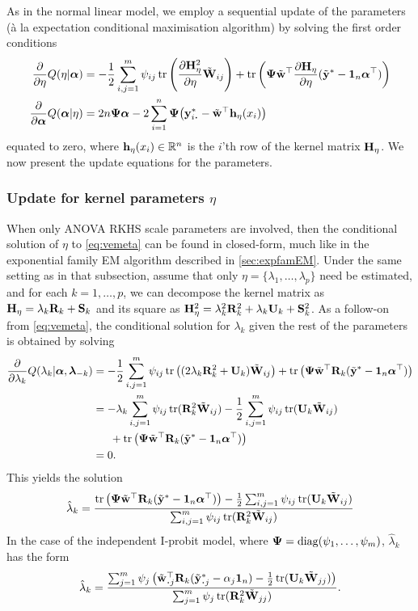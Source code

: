 As in the normal linear model, we employ a sequential update of the parameters (à la expectation conditional maximisation algorithm) by solving the first order conditions
\begin{align}
  \frac{\partial}{\partial\eta}Q(\eta|\balpha)
  &= -\half \sum_{i,j=1}^m \psi_{ij} \tr \left( \frac{\partial \bH_\eta^2}{\partial\eta} \tilde\bW_{ij} \right) 
  + \tr\left( \bPsi \tilde\bw^\top  \frac{\partial \bH_\eta}{\partial\eta} (\tilde\by^* - \bone_n\balpha^\top)  \right) \label{eq:vemeta} \\
  \frac{\partial}{\partial\balpha}Q(\balpha|\eta)
  &= 2n\bPsi\balpha - 2 \sum_{i=1}^n \bPsi \big(\by_{i\bigcdot}^* - \tilde\bw^\top\bh_\eta(x_i) \big) \label{eq:vemalpha}
\end{align}
equated to zero, where ${\mathbf h}_\eta(x_i) \in \mathbb{R}^n$ is the $i$'th row of the kernel matrix ${\mathbf H}_\eta$.
We now present the update equations for the parameters.

\subsubsection{Update for kernel parameters $\eta$}

When only ANOVA RKHS scale parameters are involved, then the conditional solution of $\eta$ to \cref{eq:vemeta} can be found in closed-form, much like in the exponential family EM algorithm described in \cref{sec:expfamEM}.
Under the same setting as in that subsection, assume that only $\eta = \{\lambda_1,\dots,\lambda_p\}$ need be estimated, and for each $k=1,\dots,p$, we can decompose the kernel matrix as ${\mathbf H}_\eta = \lambda_k {\mathbf R}_k + {\mathbf S}_k$ and its square as ${\mathbf H}_\eta^2 = \lambda_k^2 {\mathbf R}_k^2 + \lambda_k {\mathbf U}_k + {\mathbf S}_k^2$.
As a follow-on from \cref{eq:vemeta}, the conditional solution for $\lambda_k$ given the rest of the parameters is obtained by solving
\begin{align*}
  \frac{\partial}{\partial\lambda_k}Q(\lambda_k|{\bm\alpha},{\bm\lambda}_{-k})
  &= -\frac{1}{2} \sum_{i,j=1}^m \psi_{ij} \operatorname{tr} \left( (2\lambda_k{\mathbf R}_k^2 + {\mathbf U}_k) \tilde{{\mathbf W}}_{ij} \right) 
  + \operatorname{tr}\left( {\bm\Psi} \tilde{{\mathbf w}}^\top {\mathbf R}_k (\tilde{{\mathbf y}}^* - {\mathbf 1}_n{\bm\alpha}^\top)  \right) \\
  &= - \lambda_k \sum_{i,j=1}^m \psi_{ij} \operatorname{tr}({\mathbf R}_k^2\tilde{{\mathbf W}}_{ij})
  - \frac{1}{2} \sum_{i,j=1}^m \psi_{ij} \operatorname{tr}({\mathbf U}_k\tilde{{\mathbf W}}_{ij}) \\
  &\phantom{==} + \operatorname{tr}\left( {\bm\Psi} \tilde{{\mathbf w}}^\top {\mathbf R}_k (\tilde{{\mathbf y}}^* - {\mathbf 1}_n{\bm\alpha}^\top)  \right) \\
  &=0.
\end{align*}
This yields the solution
\[
  \hat\lambda_k 
  = \frac{
  \operatorname{tr}\left( {\bm\Psi} \tilde{{\mathbf w}}^\top {\mathbf R}_k (\tilde{{\mathbf y}}^* - {\mathbf 1}_n{\bm\alpha}^\top) \right)
  - \frac{1}{2} \sum_{i,j=1}^m \psi_{ij} \operatorname{tr}({\mathbf U}_k\tilde{{\mathbf W}}_{ij})
  }{
  \sum_{i,j=1}^m \psi_{ij} \operatorname{tr}({\mathbf R}_k^2\tilde{{\mathbf W}}_{ij})
  }
\]
In the case of the independent I-probit model, where ${\bm\Psi} = \operatorname{diag}(\psi_1,\dots,\psi_m)$, $\hat\lambda_k$ has the form
\[
  \hat\lambda_k
  = \frac{
  \sum_{j=1}^m \psi_j \left( \tilde\bw^\top_{\bigcdot j} \bR_k (\tilde\by^*_{\bigcdot j} - \alpha_j\bone_n) - \half \tr(\bU_k\tilde\bW_{jj})\right)
  }{
  \sum_{j=1}^m \psi_j \tr(\bR_k^2\tilde\bW_{jj})
  }.
\]

